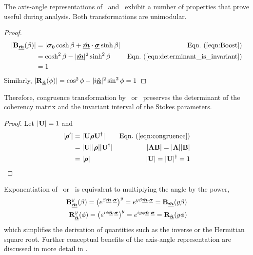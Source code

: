 The axis-angle representations of \boost\ and \rotat\ exhibit a number of properties that prove useful during analysis.
%
Both transformations are unimodular.
%
\begin{proof}
\label{proof:unimodular_boost_and_rotation}
%
\begin{align*}
|\boost| 
&= |\pauli{0}\cosh\beta + {\hat{\Pv{m}}\cdot\Pv{\sigma}}\sinh\beta| & \peqn{Boost} \\
&= \cosh^2\beta - |\hat{\Pv{m}}|^2 \sinh^2\beta & \peqn{determinant_is_invariant} \\
	&= 1
\end{align*}
Similarly,
$|{\bf R}_{\hat{\underline{\mbox{\scriptsize\boldmath $n$}}}}(\phi)| 
= \cos^2\phi - |i\hat{\underline{\mbox{\boldmath $n$}}}|^2 \sin^2\phi
	= 1$
\end{proof}
%
\noindent
Therefore, congruence transformation by \boost\ or \rotat\ preserves the determinant of the coherency matrix and the invariant interval of the Stokes parameters. %
%
\begin{proof}
\label{proof:invariant}
%
Let $|{\bf U}|=1$ and
\begin{align*}
|{\cohM{\rho}'}| &=|\JM{U}\cohM{\rho}\JM{U}^\dagger| & \peqn{congruence} \\
&=|\JM{U}||\cohM{\rho}||\JM{U}^\dagger| & |\bf{AB}| = |\bf{A}||\bf{B}| \\
&=|\cohM{\rho}| & |\JM{U}| = |\JM{U}|^\dagger = 1
\end{align*}
\end{proof}

Exponentiation of \boost\ or \rotat\ is equivalent 
to multiplying the angle by the power,
%
\begin{eqnarray}
\label{eqn:boost_power}
{\bf B}_{\hat{\underline{\mbox{\scriptsize\boldmath $m$}}}}^y(\beta) = \left( e^{\beta \hat{\underline{\mbox{\scriptsize\boldmath $m$}}} \cdot \underline{\mbox{\scriptsize\boldmath $\sigma$}}} \right)^y
= e^{y \beta \hat{\underline{\mbox{\scriptsize\boldmath $m$}}} \cdot \underline{\mbox{\scriptsize\boldmath $\sigma$}}} = {\bf B}_{\hat{\underline{\mbox{\scriptsize\boldmath $m$}}}}(y\beta) \\
{\bf R}_{\hat{\underline{\mbox{\scriptsize\boldmath $n$}}}}^y(\phi) = \left( e^{ i \phi \hat{\underline{\mbox{\scriptsize\boldmath $n$}}} \cdot \underline{\mbox{\scriptsize\boldmath $\sigma$}} } \right)^y
= e^{ i y \phi \hat{\underline{\mbox{\scriptsize\boldmath $n$}}} \cdot \underline{\mbox{\scriptsize\boldmath $\sigma$}} } = {\bf R}_{\hat{\underline{\mbox{\scriptsize\boldmath $n$}}}}(y\phi)
\label{eqn:rotation_power}
\end{eqnarray}
%
which simplifies the  
derivation of quantities such as the inverse or the Hermitian square root.
%
Further conceptual benefits of the axis-angle representation are discussed in more detail in .

\iffalse

